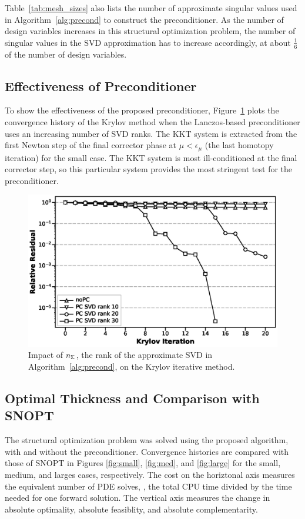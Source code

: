 Table~\ref{tab:mesh_sizes} also lists the number of approximate singular values
used in Algorithm~\ref{alg:precond} to construct the preconditioner.  As the number of design variables
increases in this structural optimization problem, the number of singular values
in the SVD approximation has to increase accordingly, at about $\frac{1}{6}$
of the number of design variables.

\subsection{Effectiveness of Preconditioner}
To show the effectiveness of the proposed preconditioner, 
Figure~\ref{fig:svdrank} plots the convergence history of the Krylov
method when the Lanczos-based preconditioner uses an 
increasing number of SVD ranks. The KKT system is extracted from 
the first Newton step of the final corrector phase 
at $\mu < \epsilon_{\mu}$ (\ie the last homotopy iteration) for the small case. 
The KKT system is most ill-conditioned at the final corrector step, so this particular system provides the most stringent test for the preconditioner.

\begin{figure}[tbp]
  \centering
  \includegraphics[width=1.0\textwidth]{./figs/chap6_fstopo/tiny_svd_ranks.eps}
  \caption{Impact of $n_{\mathsf{\Sigma}}$, the rank of the approximate SVD in
    Algorithm~\ref{alg:precond}, on the Krylov iterative method.
  \label{fig:svdrank}}
\end{figure}

\subsection{Optimal Thickness and Comparison with SNOPT}
The structural optimization problem was solved using the proposed algorithm,
with and without the preconditioner. Convergence histories are compared with 
those of SNOPT in Figures \ref{fig:small}, \ref{fig:med}, and \ref{fig:large} for the 
small, medium, and larges cases, respectively. The cost on the horiztonal axis 
measures the equivalent number of PDE solves, 
\ie, the total CPU time divided by the time needed for one
forward solution.  The vertical axis measures the change in absolute optimality, 
absolute feasiblity, and absolute complementarity.    
  
